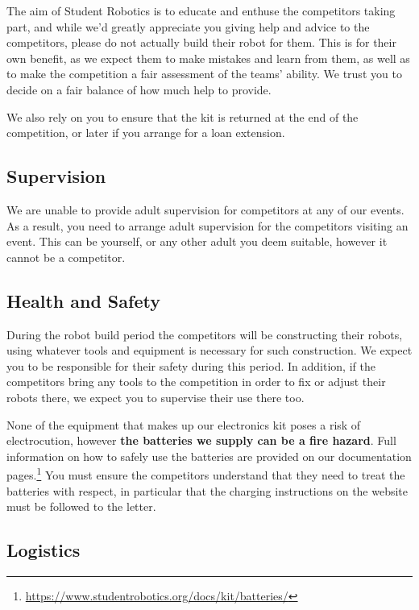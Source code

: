 \documentclass[a4paper]{article}
\begin{document}
The aim of Student Robotics is to educate and enthuse the competitors taking
part, and while we'd greatly appreciate you giving help and advice to the
competitors, please do not actually build their robot for them.
This is for their own benefit, as we expect them to make mistakes and
learn from them, as well as to make the competition a fair assessment of the
teams' ability. We trust you to decide on a fair balance of how much help to
provide.

We also rely on you to ensure that the kit is returned at the end of the
competition, or later if you arrange for a loan extension.

\subsection*{Supervision}

We are unable to provide adult supervision for competitors at any of our
events. As a result, you need to arrange adult supervision for the competitors
visiting an event. This can be yourself, or any other adult you deem suitable,
however it cannot be a competitor.

\subsection*{Health and Safety}

During the robot build period the competitors will be constructing
their robots, using whatever tools and equipment is necessary for such
construction. We expect you to be responsible for their safety during this
period. In addition, if the competitors bring any tools to the competition in
order to fix or adjust their robots there, we expect you to supervise their use
there too.

None of the equipment that makes up our electronics kit poses a risk of
electrocution, however \textbf{the batteries we supply can be a fire hazard}.
Full information on how to safely use the batteries are provided on our
documentation
pages.\footnote{\url{https://www.studentrobotics.org/docs/kit/batteries/}}
You must ensure the competitors understand that they need to treat the
batteries with respect, in particular that the charging instructions on
the website must be followed to the letter.

\subsection*{Logistics}
\end{document}
